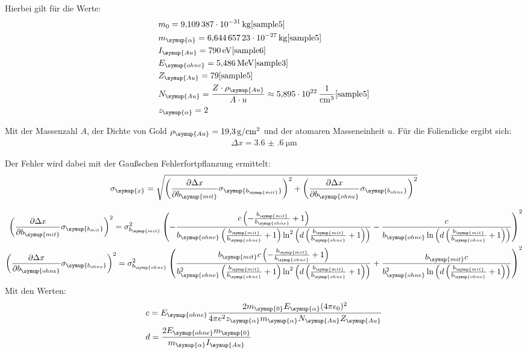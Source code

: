 Hierbei gilt für die Werte:
\begin{align*}
  &m_0 = \SI{9.109387e-31}{\kilo\gram}   \text{\cite{sample5}}\\
  &m_{\symup{\alpha}} = \SI{6.64465723e-27}{\kilo\gram} \text{\cite{sample5}}\\
  &I_{\symup{Au}} = \SI{790}{\eV} \text{\cite{sample6}}\\
  &E_{\symup{ohne}} = \SI{5.486}{\mega\eV}   \text{\cite{sample3}} \\
  &Z_{\symup{Au}} = 79 \text{\cite{sample5}}\\
  &N_{\symup{Au}} = \frac{Z \cdot \rho_{\symup{Au}}}{A \cdot u} \approx \SI{5.895e22}{\per\centi\meter\tothe3} \text{\cite{sample5}}\\
  &z_{\symup{\alpha}} = 2 \\
\end{align*}


Mit der Massenzahl $A$, der Dichte von Gold $\rho_{\symup{Au}}= \SI{19.3}{\gram\per\centi\meter\squared}$ \cite{sample7} und der atomaren Masseneinheit $u$.
Für die Foliendicke ergibt sich:
\begin{align*}
  \Delta x = \SI{3.6(6)}{\micro\meter}
\end{align*}

Der Fehler wird dabei mit der Gaußschen Fehlerfortpflanzung ermittelt:
\begin{align*}
  \sigma_{\symup{x}} = \sqrt{\left(\frac{\partial \Delta x}{\partial b_{\symup{mit}}}\sigma_{\symup{b_{\symup{mit}}}}\right)^2 + \left(\frac{\partial \Delta x}{\partial b_{\symup{ohne}}}\sigma_{\symup{b_{ohne}}}\right)^2}
\end{align*}

\begin{align*}
  \left(\frac{\partial \Delta x}{\partial b_{\symup{mit}}}\sigma_{\symup{b_{mit}}}\right)^2 = \sigma_{b_{\symup{mit}}}^{2} \left(- \frac{c \left(- \frac{b_{\symup{mit}}}{b_{\symup{ohne}}} + 1\right)}{b_{\symup{ohne}} \left(\frac{b_{\symup{mit}}}{b_{\symup{ohne}}} + 1\right) \ln^{2}{\left (d \left(\frac{b_{\symup{mit}}}{b_{\symup{ohne}}} + 1\right) \right )}} - \frac{c}{b_{\symup{ohne}} \ln{\left (d \left(\frac{b_{\symup{mit}}}{b_{\symup{ohne}}} + 1\right) \right )}}\right)^{2} \\
  \left(\frac{\partial \Delta x}{\partial b_{\symup{ohne}}}\sigma_{\symup{b_{ohne}}}\right)^2 = \sigma_{b_{\symup{ohne}}}^{2} \left(\frac{b_{\symup{mit}} c \left(- \frac{b_{\symup{mit}}}{b_{\symup{ohne}}} + 1\right)}{b_{\symup{ohne}}^{2} \left(\frac{b_{\symup{mit}}}{b_{\symup{ohne}}} + 1\right) \ln^{2}{\left (d \left(\frac{b_{\symup{mit}}}{b_{\symup{ohne}}} + 1\right) \right )}} + \frac{b_{\symup{mit}} c}{b_{\symup{ohne}}^{2} \ln{\left (d \left(\frac{b_{\symup{mit}}}{b_{\symup{ohne}}} + 1\right) \right )}}\right)^{2}
\end{align*}
Mit den Werten:
\begin{align*}
  &c =  E_{\symup{ohne}} \frac{2 m_{\symup{0}} E_{\symup{\alpha}} (4 \pi \epsilon_0)^2}{4 \pi e^2 z_{\symup{\alpha}}  m_{\symup{\alpha}} N_{\symup{Au}} Z_{\symup{Au}}} \\
  &d = \frac{2 E_{\symup{ohne}} m_{\symup{0}}}{m_{\symup{\alpha}} I_{\symup{Au}}}
\end{align*}


